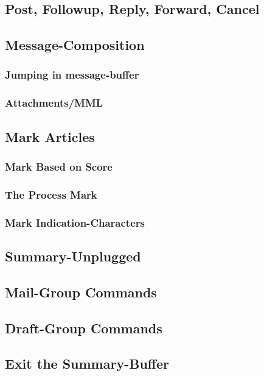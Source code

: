    \subsection*{Post, Followup, Reply, Forward, Cancel}
    \PostReplyetc
    \subsection*{Message-Composition}
    \MsgCompositionGeneral
        \subsubsection*{Jumping in message-buffer}
        \MsgCompositionMovementArticle
        \subsubsection*{Attachments/MML}
        \MsgCompositionMML
    \subsection*{Mark Articles}
    \MarkArticlesGeneral
        \subsubsection*{Mark Based on Score}
        \MarkByScore
        \subsubsection*{The Process Mark}
        \ProcessMark
        \subsubsection*{Mark Indication-Characters}
        \MarkCharacters
%
    \subsection*{Summary-Unplugged}
    \SummaryUnplugged
    \subsection*{Mail-Group Commands}
    \MailGroups
    \subsection*{Draft-Group Commands}
    \DraftGroup
    \subsection*{Exit the Summary-Buffer}
    \ExitSummary
%
%
